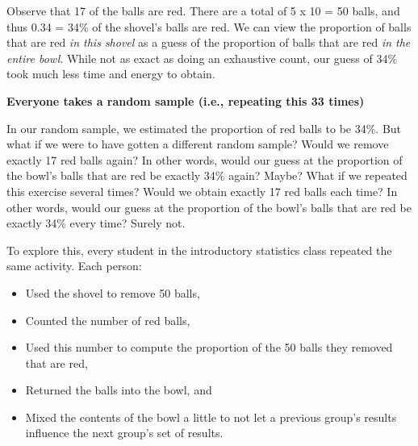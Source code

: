 \documentclass[
  letterpaper,
  DIV=11,
  numbers=noendperiod]{scrreprt}
\providecommand{\tightlist}{%
  \setlength{\itemsep}{0pt}\setlength{\parskip}{0pt}}\usepackage{longtable,booktabs,array}
\theoremstyle{definition}
\theoremstyle{remark}
\begin{document}
Observe that 17 of the balls are red. There are a total of 5 x 10 = 50
balls, and thus 0.34 = 34\% of the shovel's balls are red. We can view
the proportion of balls that are red \emph{in this shovel} as a guess of
the proportion of balls that are red \emph{in the entire bowl}. While
not as exact as doing an exhaustive count, our guess of 34\% took much
less time and energy to obtain.

\textbf{Everyone takes a random sample (i.e., repeating this 33 times)}

In our random sample, we estimated the proportion of red balls to be
34\%. But what if we were to have gotten a different random sample?
Would we remove exactly 17 red balls again? In other words, would our
guess at the proportion of the bowl's balls that are red be exactly 34\%
again? Maybe? What if we repeated this exercise several times? Would we
obtain exactly 17 red balls each time? In other words, would our guess
at the proportion of the bowl's balls that are red be exactly 34\% every
time? Surely not.

To explore this, every student in the introductory statistics class
repeated the same activity. Each person:

\begin{itemize}
\tightlist
\item
  Used the shovel to remove 50 balls,
\item
  Counted the number of red balls,
\item
  Used this number to compute the proportion of the 50 balls they
  removed that are red,
\item
  Returned the balls into the bowl, and
\item
  Mixed the contents of the bowl a little to not let a previous group's
  results influence the next group's set of results.
\end{itemize}
\end{document}
